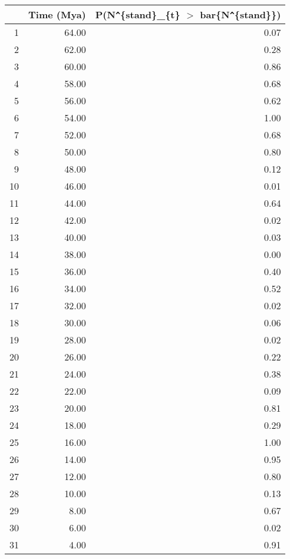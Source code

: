\begin{table}[ht]
\centering
\begin{tabular}{rrr}
  \hline
 & Time (Mya) & P(N\verb|^|\{stand\}\_\{t\} $>$ bar\{N\verb|^|\{stand\}\}) \\ 
  \hline
1 & 64.00 & 0.07 \\ 
  2 & 62.00 & 0.28 \\ 
  3 & 60.00 & 0.86 \\ 
  4 & 58.00 & 0.68 \\ 
  5 & 56.00 & 0.62 \\ 
  6 & 54.00 & 1.00 \\ 
  7 & 52.00 & 0.68 \\ 
  8 & 50.00 & 0.80 \\ 
  9 & 48.00 & 0.12 \\ 
  10 & 46.00 & 0.01 \\ 
  11 & 44.00 & 0.64 \\ 
  12 & 42.00 & 0.02 \\ 
  13 & 40.00 & 0.03 \\ 
  14 & 38.00 & 0.00 \\ 
  15 & 36.00 & 0.40 \\ 
  16 & 34.00 & 0.52 \\ 
  17 & 32.00 & 0.02 \\ 
  18 & 30.00 & 0.06 \\ 
  19 & 28.00 & 0.02 \\ 
  20 & 26.00 & 0.22 \\ 
  21 & 24.00 & 0.38 \\ 
  22 & 22.00 & 0.09 \\ 
  23 & 20.00 & 0.81 \\ 
  24 & 18.00 & 0.29 \\ 
  25 & 16.00 & 1.00 \\ 
  26 & 14.00 & 0.95 \\ 
  27 & 12.00 & 0.80 \\ 
  28 & 10.00 & 0.13 \\ 
  29 & 8.00 & 0.67 \\ 
  30 & 6.00 & 0.02 \\ 
  31 & 4.00 & 0.91 \\ 
   \hline
\end{tabular}
\label{tab:div_peak}
\end{table}
